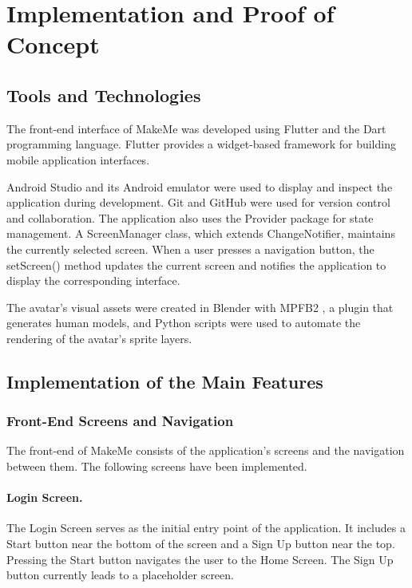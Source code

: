 \documentclass[11pt]{article}
\begin{document}
\section{Implementation and Proof of Concept}

\subsection{Tools and Technologies}

The front-end interface of MakeMe was developed using Flutter and the Dart programming language. Flutter provides a widget-based framework for building mobile application interfaces.

Android Studio and its Android emulator were used to display and inspect the application during development. Git and GitHub were used for version control and collaboration.
The application also uses the Provider package for state management. A ScreenManager class, which extends ChangeNotifier, maintains the currently selected screen.
When a user presses a navigation button, the setScreen() method updates the current screen and notifies the application to display the corresponding interface.

The avatar's visual assets were created in Blender \cite{blender} with MPFB2 \cite{mpfb2}, a plugin that generates human models, and Python scripts were used to automate the rendering of the avatar's sprite layers.

\subsection{Implementation of the Main Features}

\subsubsection{Front-End Screens and Navigation}

The front-end of MakeMe consists of the application's screens and the navigation between them. The following screens have been implemented.

\paragraph{Login Screen.}

The Login Screen serves as the initial entry point of the application. It includes a Start button near the bottom of the screen and a Sign Up button near the top.
Pressing the Start button navigates the user to the Home Screen. The Sign Up button currently leads to a placeholder screen.
\end{document}
